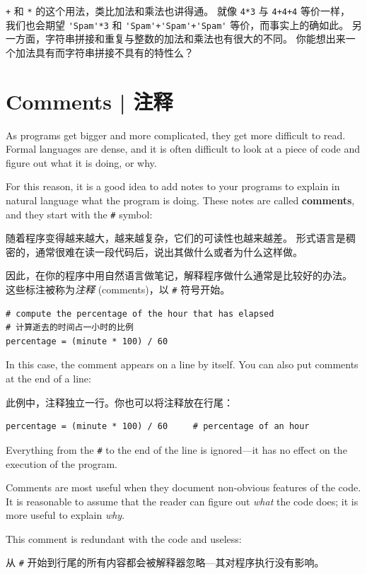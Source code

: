 \lstinline{+} 和 \lstinline{*} 的这个用法，类比加法和乘法也讲得通。 就像 \lstinline{4*3} 与 \lstinline{4+4+4} 等价一样， 我们也会期望 \lstinline{'Spam'*3} 和 \lstinline{'Spam'+'Spam'+'Spam'} 等价，而事实上的确如此。 另一方面，字符串拼接和重复与整数的加法和乘法也有很大的不同。 你能想出来一个加法具有而字符串拼接不具有的特性么？


\section{Comments  |  注释}

As programs get bigger and more complicated, they get more difficult
to read.  Formal languages are dense, and it is often difficult to
look at a piece of code and figure out what it is doing, or why.

For this reason, it is a good idea to add notes to your programs to explain
in natural language what the program is doing.  These notes are called
{\bf comments}, and they start with the \verb"#" symbol:

随着程序变得越来越大，越来越复杂，它们的可读性也越来越差。 形式语言是稠密的，通常很难在读一段代码后，说出其做什么或者为什么这样做。

因此，在你的程序中用自然语言做笔记，解释程序做什么通常是比较好的办法。 这些标注被称为\emph{注释} (comments)，以 \lstinline{#} 符号开始。

\begin{lstlisting}
# compute the percentage of the hour that has elapsed
# 计算逝去的时间占一小时的比例
percentage = (minute * 100) / 60
\end{lstlisting}
%
In this case, the comment appears on a line by itself.  You can also put
comments at the end of a line:

此例中，注释独立一行。你也可以将注释放在行尾：

\begin{lstlisting}
percentage = (minute * 100) / 60     # percentage of an hour
\end{lstlisting}
%
Everything from the {\tt \#} to the end of the line is ignored---it
has no effect on the execution of the program.

Comments are most useful when they document non-obvious features of
the code.  It is reasonable to assume that the reader can figure out
{\em what} the code does; it is more useful to explain {\em why}.

This comment is redundant with the code and useless:

从 \lstinline{#} 开始到行尾的所有内容都会被解释器忽略—其对程序执行没有影响。

